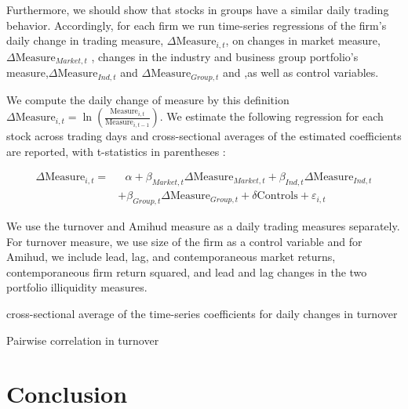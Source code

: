 \documentclass[12pt, a4paper]{article}
\begin{document}
Furthermore, we should show that stocks in groups have a similar daily trading behavior. Accordingly, for each firm we run time-series regressions of the firm's daily change in trading measure, $ \Delta \text{Measure}_{i,t} $, on changes in market measure,$ \Delta\text{Measure}_{Market,t}   $ , changes in the industry and business group portfolio's measure,$ \Delta\text{Measure}_{Ind,t} $ and  $\Delta \text{Measure}_{Group,t} $ and  ,as well as control variables.

We compute the daily change of measure by this definition $ \Delta \text{Measure}_{i,t} = \ln(\frac{\text{Measure}_{i,t}}{\text{Measure}_{i,t-1}}) $. 
We estimate the following regression for each stock across trading days and cross-sectional averages of the estimated coefficients are reported, with t-statistics in parentheses :

\begin{equation*}
	\begin{split}
		\Delta \text{Measure}_{i,t} =  & \text{	}\alpha + \beta_{Market,t} \Delta \text{Measure}_{Market,t}  
		+ \beta_{Ind,t} \Delta \text{Measure}_{Ind,t} \\ & + \beta_{Group,t} \Delta \text{Measure}_{Group,t} + \delta\text{Controls} + \varepsilon_{i,t}
	\end{split}
\end{equation*}

We use the turnover and Amihud measure as a daily trading measures separately. For turnover measure, we use size of the firm as a control variable and for Amihud, we include lead, lag, and contemporaneous market returns, contemporaneous firm return squared, and lead and lag changes in the two portfolio illiquidity measures.

\begin{table}[htbp]
	\centering
	\caption{cross-sectional average of the time-series coefficients for daily changes in turnover }
	\resizebox{0.6\textheight}{!}{
		
	}
\end{table}


\begin{table}[htbp]
	\centering
		\caption{Pairwise correlation in turnover  }
	\resizebox{0.7\textheight}{!}{
		\centering
		
	}
\end{table}


\FloatBarrier
\section{Conclusion}
\end{document}
